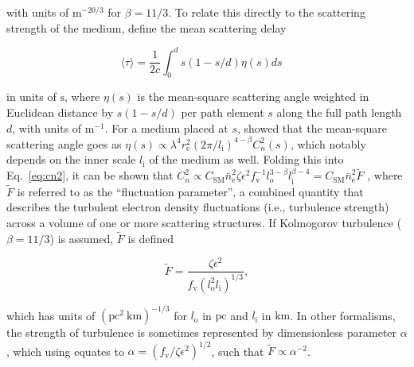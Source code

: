 \documentclass[twocolumn, linenumbers, tra]{aastex631}
\begin{document}
{\noindent
with units of $\mathrm{m}^{-20/3}$ for $\beta = 11/3$. To relate this directly to the scattering strength of the medium, \citet{Cordes2022} define the mean scattering delay

\begin{equation}\label{eq:meantau}
\langle\tau\rangle=\frac{1}{2 c} \int_0^d s(1-s / d) \eta(s) ds\quad
\end{equation}

\noindent
in units of $\mathrm{s}$, where $\eta(s)$ is the mean-square scattering angle weighted in Euclidean distance by $s(1-s / d)$ per path element $s$ along the full path length $d$, with units of $\mathrm{m}^{-1}$. For a medium placed at $s$, \citet{Cordes1998} showed that the mean-square scattering angle goes as $\eta(s) \propto \lambda^4 r_{\mathrm{e}}^2 (2\pi/l_\mathrm{i})^{4-\beta} C_n^2(s)$, which notably depends on the inner scale $l_\mathrm{i}$ of the medium as well. Folding this into Eq.~\ref{eq:cn2}, it can be shown that
$C_n^2 \propto C_{\mathrm{SM}} \bar{n}_{\mathrm{e}}^2 \zeta \epsilon^2 f_{\mathrm{v}}^{-1} l_\mathrm{o}^{3-\beta} l_\mathrm{i}^{\beta-4} = C_{\mathrm{SM}}\bar{n}_{\mathrm{e}}^2\widetilde{F}$ \citep[see][]{Cordes2022}, where $\widetilde{F}$ is referred to as the ``fluctuation parameter'', a combined quantity that describes the turbulent electron density fluctuations (i.e., turbulence strength) across a volume of one or more scattering structures. If Kolmogorov turbulence ($\beta = 11/3$) is assumed, $\widetilde{F}$ is defined

\begin{equation}\label{eq:flucparam}
\widetilde{F} = \frac{\zeta \epsilon^2}{f_{\mathrm{v}}\left(l_{\mathrm{o}}^2 l_{\mathrm{i}}\right)^{1 / 3}},
\end{equation}

\noindent
which has units of $\left(\mathrm{pc}^2 \mathrm{~km}\right)^{-1 / 3}$ for $l_\mathrm{o}$ in $\mathrm{pc}$ and $l_\mathrm{i}$ in $\mathrm{km}$. In other formalisms, the strength of turbulence is sometimes represented by dimensionless parameter $\alpha$ \citep[e.g., Eq. 1 in][]{Prochaska2019b}, which using equates to $\alpha = (f_\mathrm{v}/\zeta\epsilon^2)^{1/2}$, such that $\widetilde{F} \propto \alpha^{-2}$.

}
\end{document}
